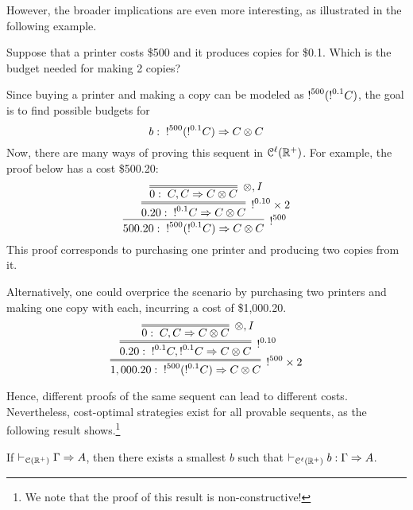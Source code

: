 %
However, the broader implications are even more interesting, as illustrated in the following example.
\begin{example}
Suppose that a printer costs \$500 and it produces copies for \$0.1. Which is the budget needed for making 2 copies?

Since buying a printer and making a copy can be modeled as  $\hbox{$\mathop{!}^{500}$}(\hbox{$\mathop{!}^{0.1}$}C)$, the goal is to find possible budgets for 
$$
b:\;  \hbox{$\mathop{!}^{500}$}(\hbox{$\mathop{!}^{0.1}$}C)\Rightarrow C\otimes C
$$
Now, there are many ways of proving this sequent in $\mathcal{C}^\ell(\mathbb{R}^+)$. For example, the proof below has a cost \$500.20:
$$
\infer[\nbang{500}]{500.20:\;  \nbang{500}(\nbang{0.1}C)\seq C\otimes C}
{\infer=[\nbang{0.10} \times 2]{0.20:\;  \nbang{0.1}C\seq C\otimes C}
{\infer=[\otimes,I]{0:\;  C,C\seq C\otimes C}{}}} 
$$
This proof corresponds to purchasing one printer and producing two copies from it.

Alternatively, one could overprice the scenario by purchasing two printers and making one copy with each, incurring a cost of \$1,000.20.
$$
\infer=[\nbang{500}  \times 2]{1,000.20:\;  \nbang{500}(\nbang{0.1}C)\seq C\otimes C}
{\infer=[\nbang{0.10}]{0.20:\;  \nbang{0.1}C,\nbang{0.1}C\seq C\otimes C}
{\infer=[\otimes,I]{0:\;  C,C\seq C\otimes C}{}}} 
$$
\end{example}
Hence, different proofs of the same sequent can lead to different costs. Nevertheless, cost-optimal strategies exist for all provable sequents, as the following result shows.\footnote{We note that the proof of this result is non-constructive!}

\begin{theorem}\label{cor:spectrum}
If $\vdash_{\mathcal{C}(\mathbb{R}^+)}\Gamma\Rightarrow A$, then there exists a smallest $b$ such that $\vdash_{\mathcal{C}^\ell(\mathbb{R}^+)}b: \Gamma\Rightarrow A$.
\end{theorem}

